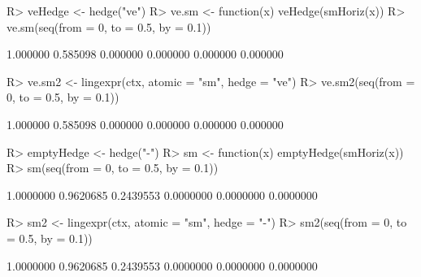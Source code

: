 \documentclass{article}\usepackage[]{graphicx}\usepackage[]{color}
\begin{document}
\begin{Schunk}
% --begin: "hedge"
\begin{Sinput}
R> veHedge <- hedge("ve")
R> ve.sm <- function(x) veHedge(smHoriz(x))
R> ve.sm(seq(from = 0, to = 0.5, by = 0.1))
\end{Sinput}
\begin{Soutput}
[1] 1.000000 0.585098 0.000000 0.000000 0.000000 0.000000
\end{Soutput}
%
% --end: "hedge"
\end{Schunk}


\begin{Schunk}
% --begin: "lingexpr"
\begin{Sinput}
R> ve.sm2 <- lingexpr(ctx, atomic = "sm", hedge = "ve")
R> ve.sm2(seq(from = 0, to = 0.5, by = 0.1))
\end{Sinput}
\begin{Soutput}
[1] 1.000000 0.585098 0.000000 0.000000 0.000000 0.000000
\end{Soutput}
%
% --end: "lingexpr"
\end{Schunk}

\begin{Schunk}
% --begin: "emptyhedge1"
\begin{Sinput}
R> emptyHedge <- hedge("-")
R> sm <- function(x) emptyHedge(smHoriz(x))
R> sm(seq(from = 0, to = 0.5, by = 0.1))
\end{Sinput}
\begin{Soutput}
[1] 1.0000000 0.9620685 0.2439553 0.0000000 0.0000000 0.0000000
\end{Soutput}
%
% --end: "emptyhedge1"
\end{Schunk}

\begin{Schunk}
% --begin: "emptyhedge2"
\begin{Sinput}
R> sm2 <- lingexpr(ctx, atomic = "sm", hedge = "-")
R> sm2(seq(from = 0, to = 0.5, by = 0.1))
\end{Sinput}
\begin{Soutput}
[1] 1.0000000 0.9620685 0.2439553 0.0000000 0.0000000 0.0000000
\end{Soutput}
%
% --end: "emptyhedge2"
\end{Schunk}
\end{document}
